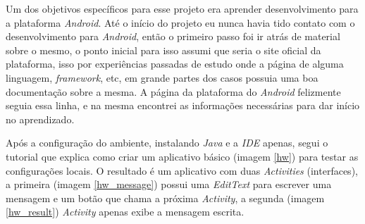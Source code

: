 \documentclass[hidelinks,12pt]{article}
\begin{document}
Um dos objetivos espec\'ificos para esse projeto era aprender desenvolvimento para a plataforma \textit{Android}. At\'e o in\'icio do projeto eu nunca havia tido contato com o desenvolvimento para \textit{Android}, ent\~ao o primeiro passo foi ir atr\'as de material sobre o mesmo, o ponto inicial para isso assumi que seria o site oficial da plataforma, isso por experiências passadas de estudo onde a p\'agina de alguma linguagem, \textit{framework}, etc, em grande partes dos casos possuia uma boa documenta\c{c}\~ao sobre a mesma. A p\'agina da plataforma do \textit{Android} felizmente seguia essa linha, e na mesma encontrei as informa\c{c}\~oes necess\'arias para dar in\'icio no aprendizado.

Ap\'os a configura\c{c}\~ao do ambiente, instalando \textit{Java} e a \textit{IDE} apenas, segui o tutorial \cite{androidhw} que explica como criar um aplicativo b\'asico (imagem \ref{hw}) para testar as configura\c{c}\~oes locais. O resultado \'e um aplicativo com duas \textit{Activities} (interfaces), a primeira (imagem \ref*{hw_message}) possui uma \textit{EditText} para escrever uma mensagem e um bot\~ao que chama a pr\'oxima \textit{Activity}, a segunda (imagem \ref*{hw_result}) \textit{Activity} apenas exibe a mensagem escrita.
\end{document}
